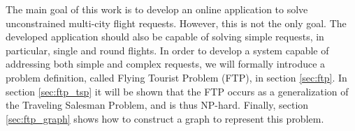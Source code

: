 The main goal of this work is to develop an online application to solve unconstrained multi-city flight requests. However, this is not the only goal. The developed application should also be capable of solving simple requests, in particular, single and round flights. In order to develop a system capable of addressing both simple and complex requests, we will formally introduce a problem definition, called Flying Tourist Problem (FTP), in section \ref{sec:ftp}. In section \ref{sec:ftp_tsp} it will be shown that the FTP occurs as a generalization of the Traveling Salesman Problem, and is thus NP-hard. Finally, section \ref{sec:ftp_graph} shows how to construct a graph to represent this problem.